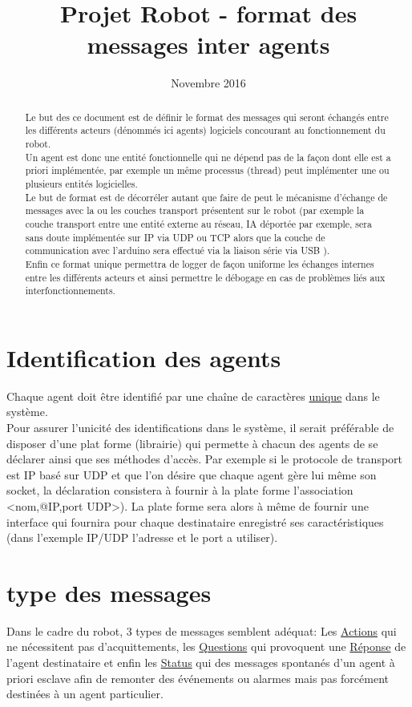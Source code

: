 \documentclass[french]{article}
\begin{document}
\title{Projet Robot - format des messages inter agents}
\date{Novembre 2016}
\maketitle
\begin{abstract}
Le but des ce document est de définir le format des messages qui seront échangés entre les différents acteurs (dénommés ici agents) logiciels concourant au fonctionnement du robot.\\
Un agent est donc une entité fonctionnelle qui ne dépend pas de la façon dont elle est a priori implémentée, par exemple un même processus (thread) peut implémenter une ou plusieurs entités logicielles.\\
Le but de format est de décorréler autant que faire de peut le mécanisme d'échange de messages avec la ou les couches transport présentent sur le robot (par exemple la couche transport entre une entité externe au réseau, IA déportée par exemple, sera sans doute implémentée sur IP via UDP ou TCP alors que la couche de communication avec l'arduino sera effectué via la liaison série via USB ).\\
Enfin ce format unique permettra de logger de façon uniforme les échanges internes entre les différents acteurs et ainsi permettre le débogage en cas de problèmes liés aux interfonctionnements. 
\end{abstract}
\section{Identification des agents}
Chaque agent doit être identifié par une chaîne de caractères \underline{unique} dans le système.\\
Pour assurer l'unicité des identifications dans le système, il serait préférable de disposer d'une plat forme (librairie) qui permette à chacun des agents de se déclarer ainsi que ses méthodes d'accès. Par exemple si le protocole de transport est IP basé sur UDP et que l'on désire que chaque agent gère lui même son socket, la déclaration consistera à fournir à la plate forme l'association <nom,@IP,port UDP>). La plate forme sera alors à même de fournir une interface qui fournira pour chaque destinataire enregistré ses caractéristiques (dans l'exemple IP/UDP l'adresse et le port a utiliser).\\
\section{type des messages}
Dans le cadre du robot, 3 types de messages semblent adéquat: Les \underline{Actions} qui ne nécessitent pas d’acquittements, les \underline{Questions} qui provoquent une \underline{Réponse} de l'agent destinataire et enfin les \underline{Status} qui des messages spontanés d'un agent à priori esclave afin de remonter des événements ou alarmes mais pas forcément destinées à un agent particulier. 
\end{document}
